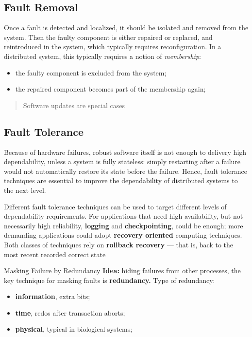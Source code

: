 \documentclass[11pt, a4paper]{article}
\begin{document}
\subsection{Fault Removal}\label{sub:fault_removal} %
Once a fault is detected and localized, it should be isolated and removed from the system.
Then the faulty component is either repaired or replaced, and reintroduced in the system, which typically requires reconfiguration.
In a distributed system, this typically requires a notion of \textit{membership}:
\begin{itemize}
    \item the faulty component is excluded from the system;
    \item the repaired component becomes part of the membership again;
\end{itemize}
\begin{quote}
    Software updates are special cases
\end{quote}
\subsection{Fault Tolerance}\label{sub:fault_tolerance} %
Because of hardware failures, robust software itself is not enough to delivery high dependability, unless a system is fully stateless: simply restarting after a failure would not automatically restore its state before the failure.
Hence, fault tolerance techniques are essential to improve the dependability of distributed systems to the next level.
\begin{note}{}
    Different fault tolerance techniques can be used to target different levels of dependability requirements.
    For applications that need high availability, but not necessarily high reliability, \textbf{logging} and \textbf{checkpointing}, could be enough; more demanding applications could adopt \textbf{recovery oriented} computing techniques.
    Both classes of techniques rely on \textbf{rollback recovery} --- that is, back to the most recent recorded correct state
\end{note}
\begin{example}{Masking Failure by Redundancy}{}
    \textbf{Idea:} hiding failures from other processes, the key technique for masking faults is \textbf{redundancy.}
    Type of redundancy:
    \begin{itemize}
        \item \textbf{information}, extra bits;
        \item \textbf{time}, redos after transaction aborts;
        \item \textbf{physical}, typical in biological systems;
    \end{itemize}
\end{example}
%
\end{document}
